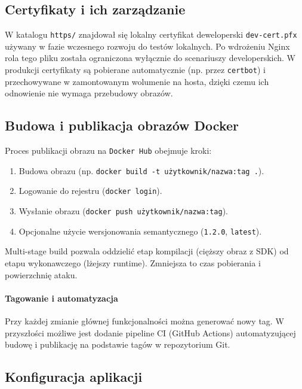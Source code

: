 \subsection{Certyfikaty i ich zarządzanie}

W katalogu \texttt{https/} znajdował się lokalny certyfikat deweloperski \texttt{dev-cert.pfx} używany w fazie wczesnego rozwoju do testów lokalnych. Po wdrożeniu Nginx rola tego pliku została ograniczona wyłącznie do scenariuszy developerskich. W produkcji certyfikaty są pobierane automatycznie (np. przez \texttt{certbot}) i przechowywane w zamontowanym wolumenie na hosta, dzięki czemu ich odnowienie nie wymaga przebudowy obrazów.

\subsection{Budowa i publikacja obrazów Docker}

Proces publikacji obrazu na \texttt{Docker Hub} obejmuje kroki:
\begin{enumerate}
    \item Budowa obrazu (np. \texttt{docker build -t użytkownik/nazwa:tag .}).
    \item Logowanie do rejestru (\texttt{docker login}).
    \item Wysłanie obrazu (\texttt{docker push użytkownik/nazwa:tag}).
    \item Opcjonalne użycie wersjonowania semantycznego (\texttt{1.2.0}, \texttt{latest}).
\end{enumerate}

Multi-stage build pozwala oddzielić etap kompilacji (cięższy obraz z SDK) od etapu wykonawczego (lżejszy runtime). Zmniejsza to czas pobierania i powierzchnię ataku.

\paragraph{Tagowanie i automatyzacja} Przy każdej zmianie głównej funkcjonalności można generować nowy tag. W przyszłości możliwe jest dodanie pipeline CI (GitHub Actions) automatyzującej budowę i publikację na podstawie tagów w repozytorium Git.

\subsection{Konfiguracja aplikacji}

